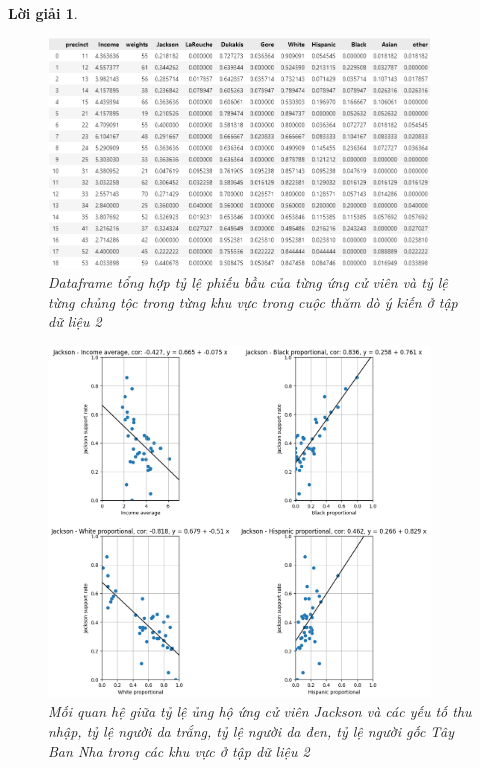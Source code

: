 \documentclass[14pt, a4paper]{article}
\theoremstyle{sltheorem}
\theoremstyle{soltheorem}
\newtheorem*{loigiai}{Lời giải}
\begin{document}
\begin{loigiai}
\begin{enumerate}
    \begin{figure}[H]
        \centering
        \includegraphics[width=0.9\textwidth]{figures/total_vote_df.png}
        \caption{Dataframe tổng hợp tỷ lệ phiếu bầu của từng ứng cử viên và tỷ lệ từng chủng tộc trong từng khu vực trong cuộc thăm dò ý kiến ở tập dữ liệu 2}
        \label{fig:total_vote_df}
    \end{figure}


    \begin{figure}[H]
        \centering
        \includegraphics[width=0.9\textwidth]{figures/Jackson_candidate_relationship_factor.png}
        \caption{Mối quan hệ giữa tỷ lệ ủng hộ ứng cử viên Jackson và các yếu tố thu nhập, tỷ lệ người da trắng, tỷ lệ người da đen, tỷ lệ người gốc Tây Ban Nha trong các khu vực ở tập dữ liệu 2}
        \label{fig:Jackson_candidate_relationship_factor}
    \end{figure}


\end{enumerate}
\end{loigiai}
\end{document}

